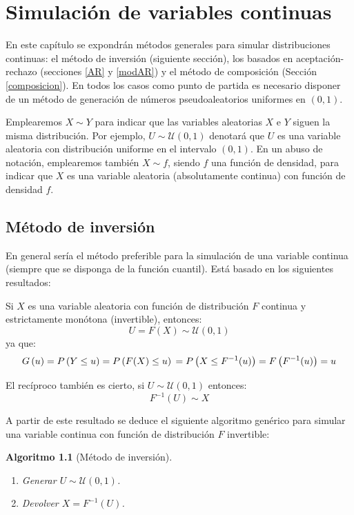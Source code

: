 \documentclass[
  spanish,
  10pt,
]{book}
\theoremstyle{break}
\newtheorem{conjecture}{Algoritmo}[chapter]
\theoremstyle{nonumberplain}
\begin{document}
\chapter{Simulación de variables continuas}\label{continuas}

En este capítulo se expondrán métodos generales para simular distribuciones continuas: el método de inversión (siguiente sección), los basados en aceptación-rechazo (secciones \ref{AR} y \ref{modAR}) y el método de composición (Sección \ref{composicion}).
En todos los casos como punto de partida es necesario disponer de un método de generación de números pseudoaleatorios uniformes en \((0,1)\).

Emplearemos \(X \sim Y\) para indicar que las variables aleatorias \(X\) e \(Y\) siguen la misma distribución.
Por ejemplo, \(U \sim \mathcal{U}(0,1)\) denotará que \(U\) es una variable aleatoria con distribución uniforme en el intervalo \((0,1)\).
En un abuso de notación, emplearemos también \(X \sim f\), siendo \(f\) una función de densidad, para indicar que \(X\) es una variable aleatoria (absolutamente continua) con función de densidad \(f\).

\section{Método de inversión}\label{inversion}

En general sería el método preferible para la simulación de una variable continua (siempre que se disponga de la función cuantil).
Está basado en los siguientes resultados:

Si \(X\) es una variable aleatoria con función de distribución \(F\) continua y estrictamente monótona (invertible), entonces:
\[U = F\left( X \right) \sim \mathcal{U}(0, 1)\]
ya que:
\[G\left( u \right) = P\left( Y \leq u \right) 
= P\left( F(X) \leq u \right) \\
= P\left( X \leq F^{-1}(u) \right) 
= F\left( F^{-1}(u) \right) = u\]

El recíproco también es cierto, si \(U \sim \mathcal{U}(0, 1)\) entonces:
\[F^{-1}\left( U \right) \sim X\]

A partir de este resultado se deduce el siguiente algoritmo genérico para simular una variable continua con función de distribución \(F\) invertible:

\begin{conjecture}[Método de inversión]
\protect\hypertarget{cnj:inversion}{}\label{cnj:inversion}

\begin{enumerate}
\def\labelenumi{\arabic{enumi}.}
\item
  Generar \(U \sim \mathcal{U}(0, 1)\).
\item
  Devolver \(X = F^{-1}\left( U \right)\).
\end{enumerate}

\end{conjecture}
\end{document}

